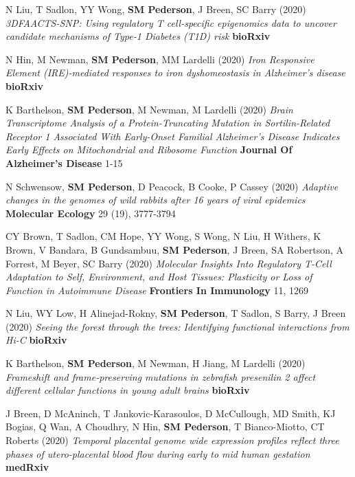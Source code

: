 \documentclass[11pt,a4paper,]{moderncv}
\begin{document}
\begin{modenumerate}
     \item N Liu, T Sadlon, YY Wong, \textbf{SM Pederson}, J Breen, SC Barry (2020) \emph{3DFAACTS-SNP: Using regulatory T cell-specific epigenomics data to uncover candidate mechanisms of Type-1 Diabetes (T1D) risk} \textbf{bioRxiv}  \\[-4mm] 
     \item N Hin, M Newman, \textbf{SM Pederson}, MM Lardelli (2020) \emph{Iron Responsive Element (IRE)-mediated responses to iron dyshomeostasis in Alzheimer's disease} \textbf{bioRxiv}  \\[-4mm] 
     \item K Barthelson, \textbf{SM Pederson}, M Newman, M Lardelli (2020) \emph{Brain Transcriptome Analysis of a Protein-Truncating Mutation in Sortilin-Related Receptor 1 Associated With Early-Onset Familial Alzheimer's Disease Indicates Early Effects on Mitochondrial and Ribosome Function} \textbf{Journal Of Alzheimer's Disease} 1-15 \\[-4mm] 
     \item N Schwensow, \textbf{SM Pederson}, D Peacock, B Cooke, P Cassey (2020) \emph{Adaptive changes in the genomes of wild rabbits after 16 years of viral epidemics} \textbf{Molecular Ecology} 29 (19), 3777-3794 \\[-4mm] 
     \item CY Brown, T Sadlon, CM Hope, YY Wong, S Wong, N Liu, H Withers, K Brown, V Bandara, B Gundsambuu, \textbf{SM Pederson}, J Breen, SA Robertson, A Forrest, M Beyer, SC Barry (2020) \emph{Molecular Insights Into Regulatory T-Cell Adaptation to Self, Environment, and Host Tissues: Plasticity or Loss of Function in Autoimmune Disease} \textbf{Frontiers In Immunology} 11, 1269 \\[-4mm] 
     \item N Liu, WY Low, H Alinejad-Rokny, \textbf{SM Pederson}, T Sadlon, S Barry, J Breen (2020) \emph{Seeing the forest through the trees: Identifying functional interactions from Hi-C} \textbf{bioRxiv}  \\[-4mm] 
     \item K Barthelson, \textbf{SM Pederson}, M Newman, H Jiang, M Lardelli (2020) \emph{Frameshift and frame-preserving mutations in zebrafish presenilin 2 affect different cellular functions in young adult brains} \textbf{bioRxiv}  \\[-4mm] 
     \item J Breen, D McAninch, T Jankovic-Karasoulos, D McCullough, MD Smith, KJ Bogias, Q Wan, A Choudhry, N Hin, \textbf{SM Pederson}, T Bianco-Miotto, CT Roberts (2020) \emph{Temporal placental genome wide expression profiles reflect three phases of utero-placental blood flow during early to mid human gestation} \textbf{medRxiv}  \\[-4mm] 

\end{modenumerate}
\end{document}
